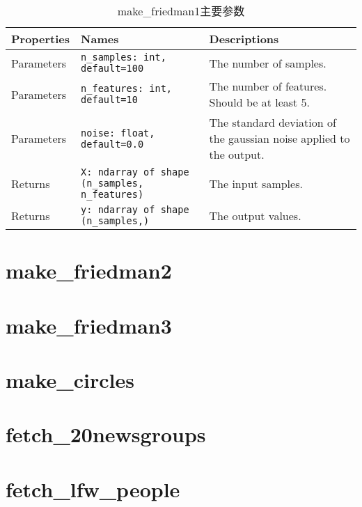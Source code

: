 \begin{table}[H]
    \centering
    \caption{make\_friedman1主要参数}
    \begin{tabularx}{\textwidth}{llX}
        \hline
        Properties & Names                                              & Descriptions                                                        \\
        \hline
        Parameters & \verb|n_samples: int, default=100|                 & The number of samples.                                              \\
        Parameters & \verb|n_features: int, default=10|                 & The number of features. Should be at least 5.                       \\
        Parameters & \verb|noise: float, default=0.0|                   & The standard deviation of the gaussian noise applied to the output. \\
        Returns    & \verb|X: ndarray of shape (n_samples, n_features)| & The input samples.                                                  \\
        Returns    & \verb|y: ndarray of shape (n_samples,)|            & The output values.                                                  \\
        \hline
    \end{tabularx}
\end{table}
\section{make\_friedman2\label{makefriedman2}}
\section{make\_friedman3\label{makefriedman3}}
\section{make\_circles\label{makecircles}}
\section{fetch\_20newsgroups\label{fetch20newsgroups}}
\section{fetch\_lfw\_people\label{fetchlfwpeople}}